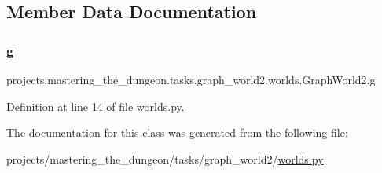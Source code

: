 \subsection{Member Data Documentation}
\mbox{\label{classprojects_1_1mastering__the__dungeon_1_1tasks_1_1graph__world2_1_1worlds_1_1GraphWorld2_a3df3da0c9fe46e780d274bb455003f37}} 
\subsubsection{\texorpdfstring{g}{g}}
{\footnotesize\ttfamily projects.\+mastering\+\_\+the\+\_\+dungeon.\+tasks.\+graph\+\_\+world2.\+worlds.\+Graph\+World2.\+g}



Definition at line 14 of file worlds.\+py.



The documentation for this class was generated from the following file\+:\begin{DoxyCompactItemize}
\item 
projects/mastering\+\_\+the\+\_\+dungeon/tasks/graph\+\_\+world2/\hyperlink{projects_2mastering__the__dungeon_2tasks_2graph__world2_2worlds_8py}{worlds.\+py}\end{DoxyCompactItemize}
